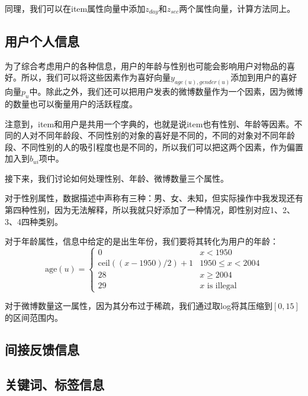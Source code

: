 \documentclass[12pt]{article} %
\newcommand\pp{\boldsymbol{\mathit{p}}}
\newcommand\yy{\boldsymbol{\mathit{y}}}
\newcommand\zz{\boldsymbol{\mathit{z}}}
\begin{document}
\begin{sloppypar}
同理，我们可以在item属性向量中添加$\zz_{day}$和$\zz_{sec}$两个属性向量，计算方法同上。


\subsection{用户个人信息}

为了综合考虑用户的各种信息，用户的年龄与性别也可能会影响用户对物品的喜好。所以，我们可以将这些因素作为喜好向量$\yy_{age(u),gender(u)}$添加到用户的喜好向量$\pp_u$中。除此之外，我们还可以把用户发表的微博数量作为一个因素，因为微博的数量也可以衡量用户的活跃程度。

注意到，item和用户是共用一个字典的，也就是说item也有性别、年龄等因素。不同的人对不同年龄段、不同性别的对象的喜好是不同的，不同的对象对不同年龄段、不同性别的人的吸引程度也是不同的，所以我们可以把这两个因素，作为偏置加入到$b_{ui}$项中。

接下来，我们讨论如何处理性别、年龄、微博数量三个属性。

对于性别属性，数据描述中声称有三种：男、女、未知，但实际操作中我发现还有第四种性别，因为无法解释，所以我就只好添加了一种情况，即性别对应1、2、3、4四种类别。

对于年龄属性，信息中给定的是出生年份，我们要将其转化为用户的年龄：
\begin{equation}
\text{age}(u) =
\begin{cases}
0 & x<1950 \\
\text{ceil}((x-1950)/2)+1& 1950\le x < 2004 \\
28 & x\ge 2004 \\
29 & x \text{ is illegal}
\end{cases}
\end{equation}

对于微博数量这一属性，因为其分布过于稀疏，我们通过取log将其压缩到$[0,15]$的区间范围内。


\subsection{间接反馈信息}



\subsection{关键词、标签信息}



\end{sloppypar}
\end{document}
